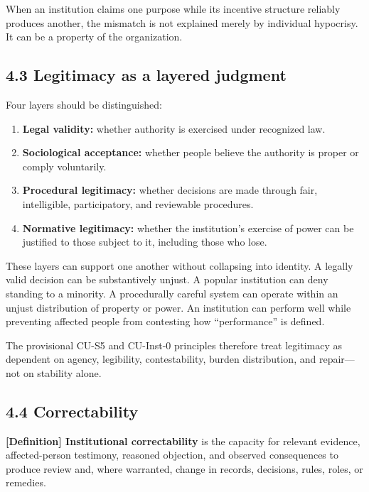 \documentclass[
  11pt,
]{article}
\providecommand{\tightlist}{%
  \setlength{\itemsep}{0pt}\setlength{\parskip}{0pt}}
\begin{document}
When an institution claims one purpose while its incentive structure
reliably produces another, the mismatch is not explained merely by
individual hypocrisy. It can be a property of the organization.

\subsection{4.3 Legitimacy as a layered
judgment}\label{legitimacy-as-a-layered-judgment}

Four layers should be distinguished:

\begin{enumerate}
\def\labelenumi{\arabic{enumi}.}
\tightlist
\item
  \textbf{Legal validity:} whether authority is exercised under
  recognized law.
\item
  \textbf{Sociological acceptance:} whether people believe the authority
  is proper or comply voluntarily.
\item
  \textbf{Procedural legitimacy:} whether decisions are made through
  fair, intelligible, participatory, and reviewable procedures.
\item
  \textbf{Normative legitimacy:} whether the institution's exercise of
  power can be justified to those subject to it, including those who
  lose.
\end{enumerate}

These layers can support one another without collapsing into identity. A
legally valid decision can be substantively unjust. A popular
institution can deny standing to a minority. A procedurally careful
system can operate within an unjust distribution of property or power.
An institution can perform well while preventing affected people from
contesting how ``performance'' is defined.

The provisional CU-S5 and CU-Inst-0 principles therefore treat
legitimacy as dependent on agency, legibility, contestability, burden
distribution, and repair---not on stability alone.

\subsection{4.4 Correctability}\label{correctability}

\textbf{{[}Definition{]} Institutional correctability} is the capacity
for relevant evidence, affected-person testimony, reasoned objection,
and observed consequences to produce review and, where warranted, change
in records, decisions, rules, roles, or remedies.
\end{document}
